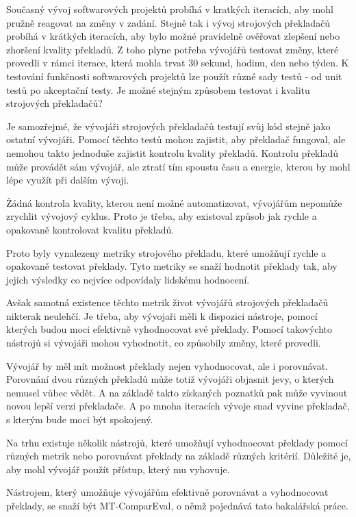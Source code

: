 Současný vývoj softwarových projektů probíhá v kratkých iteracích,
  aby mohl pružně reagovat na změny v zadání.
Stejně tak i vývoj strojových překladačů probíhá v krátkých iteracích,
  aby bylo možné pravidelně ověřovat zlepšení nebo zhoršení kvality překladů.
Z toho plyne potřeba vývojářů testovat změny,
  které provedli v rámci iterace,
  která mohla trvat 30 sekund, hodinu, den nebo týden.
K testování funkčnosti softwarových projektů lze použít různé sady testů - od unit testů po akceptační testy.
Je možné stejným způsobem testovat i kvalitu strojových překladačů?

Je samozřejmé, 
  že vývojáři strojových překladačů testují svůj kód stejně jako ostatní vývojáři.
Pomocí těchto testů mohou zajistit,
  aby překladač fungoval,
  ale nemohou takto jednoduše zajistit kontrolu kvality překladů.
Kontrolu překladů může provádět sám vývojář,
  ale ztratí tím spoustu času a energie,
  kterou by mohl lépe využít při dalším vývoji.

Žádná kontrola kvality, kterou není možné automatizovat,
  vývojářům nepomůže zrychlit vývojový cyklus.
Proto je třeba,
  aby existoval způsob jak rychle a opakovaně kontrolovat kvalitu překladů.

Proto byly vynalezeny metriky strojového překladu,
  které umožňují rychle a opakovaně testovat překlady.
Tyto metriky se snaží hodnotit překlady tak,
  aby jejich výsledky co nejvíce odpovídaly lidskému hodnocení.

Avšak samotná existence těchto metrik život vývojářů strojových překladačů nikterak neulehčí.
Je třeba, aby vývojaři měli k dispozici nástroje,
  pomocí kterých budou moci efektivně vyhodnocovat své překlady.
Pomocí takovýchto nástrojů si vývojáři mohou vyhodnotit,
  co způsobily změny, které provedli.

Vývojář by měl mít možnost překlady nejen vyhodnocovat,
  ale i porovnávat.
Porovnání dvou různých překladů může totiž vývojáři objasnit jevy,
  o kterých nemusel vůbec vědět.
A na základě takto získaných poznatků pak může vyvinout novou lepší verzi překladače.
A po mnoha iteracích vývoje snad vyvine překladač,
  s kterým bude moci být spokojený.

Na trhu existuje několik nástrojů,
  které umožňují vyhodnocovat překlady pomocí různých metrik
  nebo porovnávat překlady na základě různých kritérií.
Důležité je,
  aby mohl vývojář použít přístup,
  který mu vyhovuje.

Nástrojem,
  který umožňuje vývojářům efektivně porovnávat a vyhodnocovat překlady,
  se snaží být MT-ComparEval, 
  o němž pojednává tato bakalářská práce.
